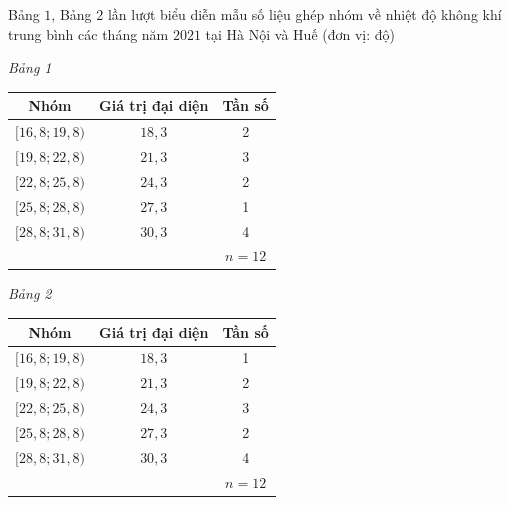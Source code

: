 \begin{ex}%
	Bảng $1$, Bảng $2$ lần lượt biểu diễn mẫu số liệu ghép nhóm về nhiệt độ không khí trung bình các tháng năm $2021$ tại Hà Nội và Huế (đơn vị: độ)
	\begin{center}
		\begin{minipage}[t]{0.45\textwidth}
			\centering
			{\it Bảng 1}\\
			\vspace{0.2cm}
			\begin{tabular}{|c|c|c|}
				\hline
				Nhóm & Giá trị đại diện & Tần số \\
				\hline
				$[16{,}8; 19{,}8)$ & $18{,}3$ & 2 \\
				{$[19{,}8; 22{,}8)$} & $21{,}3$ & 3 \\
				{$[22{,}8; 25{,}8)$} & $24{,}3$ & 2 \\
				{$[25{,}8; 28{,}8)$} & $27{,}3$ & 1 \\
				{$[28{,}8; 31{,}8)$} & $30{,}3$ & 4 \\
				\hline
				& &$n=12$ \\
				\hline
			\end{tabular}
		\end{minipage}			
		\hspace{0.05\textwidth}
		\begin{minipage}[t]{0.45\textwidth}
			\centering
			{\it Bảng 2}\\
			\vspace{0.2cm}
			\begin{tabular}{|c|c|c|}
				\hline
				Nhóm & Giá trị đại diện & Tần số \\
				\hline
				$[16{,}8; 19{,}8)$ & $18{,}3$ & 1 \\
				{$[19{,}8; 22{,}8)$} & $21{,}3$ & 2 \\
				{$[22{,}8; 25{,}8)$} & $24{,}3$ & 3 \\
				{$[25{,}8; 28{,}8)$} & $27{,}3$ & 2 \\
				{$[28{,}8; 31{,}8)$} & $30{,}3$ & 4 \\
				\hline
				& &$n=12$ \\
				\hline			
			\end{tabular}
		\end{minipage}
	\end{center}
	

\end{ex}

